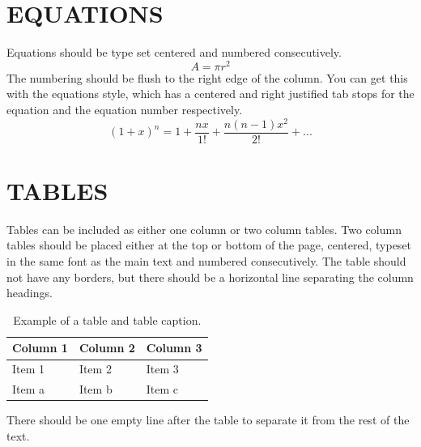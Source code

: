 \documentclass[a4paper, english, 9pt,twocolumn]{extarticle} %
\renewcommand\_[2][1]{\ifmmode _{\textnormal{\scalebox{#1}{#2}}}\else\underscore#2\fi} %
\renewcommand\^[2][1]{\ifmmode ^{\textnormal{\scalebox{#1}{#2}}}\else\xor#2\fi} %
\begin{document}
\section*{EQUATIONS}
Equations should be type set centered and numbered consecutively.
\begin{equation} %
    A = \pi r^2
\end{equation}
The numbering should be flush to the right edge of the column. You can get this with the equations style, which has a centered and right justified tab stops for the equation and the equation number respectively.
\begin{equation}
    (1+x)^n = 1 + \frac{nx}{1!}+\frac{n(n-1)x^2}{2!}+...
\end{equation}

\section*{TABLES}
Tables can be included as either one column or two column tables. Two column tables should be placed either at the top or bottom of the page, centered, typeset in the same font as the main text and numbered consecutively. The table should not have any borders, but there should be a horizontal line separating the column headings.


    \begin{table}[h]
\caption{Example of a table and table caption.} %
\label{tab:ExampleTable}
\begin{tabularx}{\columnwidth}{XXX} %
\toprule
Column 1 & Column 2 & Column 3 \\
\midrule %
Item 1   & Item 2   & Item 3   \\
Item a   & Item b   & Item c   \\
\bottomrule
\end{tabularx}
\end{table}

There should be one empty line after the table to separate it from the rest of the text.
\end{document}
